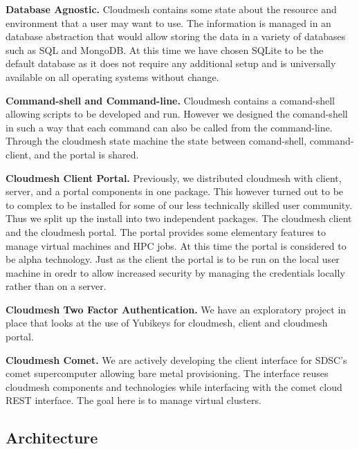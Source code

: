 \documentclass[9pt,twocolumn,twoside]{../../styles/osajnl}
\begin{document}
\begin{description}
\item{\bf Database Agnostic.} Cloudmesh contains some state about the
resource and environment that a user may want to use. The information
is managed in an database abstraction that would allow storing the
data in a variety of databases such as SQL and MongoDB. At this time
we have chosen SQLite to be the default database as it does not
require any additional setup and is universally available on all
operating systems without change.

\item{\bf Command-shell and Command-line.} Cloudmesh contains a
  comand-shell allowing scripts to be developed and run. However we
  designed the comand-shell in such a way that each command can also
  be called from the command-line. Through the cloudmesh state machine
  the state between comand-shell, command-client, and the portal is
  shared.

\item{\bf Cloudmesh Client Portal.} Previously, we distributed
cloudmesh with client, server, and a portal components in one
package. This however turned out to be to complex to be installed for
some of our less technically skilled user community. Thus we split up
the install into two independent packages. The cloudmesh client and
the cloudmesh portal. The portal provides some elementary features to
manage virtual machines and HPC jobs. At this time the portal is
considered to be alpha technology. Just as the client the portal is to
be run on the local user machine in oredr to allow increased security
by managing the credentials locally rather than on a server.

\item{\bf Cloudmesh Two Factor Authentication.} We have an
exploratory project in place that looks at the use of Yubikeys for
cloudmesh, client and cloudmesh portal.

\item{\bf Cloudmesh Comet.} We are actively developing the client
interface for SDSC’s comet supercomputer allowing bare metal
provisioning. The interface reuses cloudmesh components and
technologies while interfacing with the comet cloud REST
interface. The goal here is to manage virtual clusters.

\end{description}

\subsection{Architecture}
\end{document}
